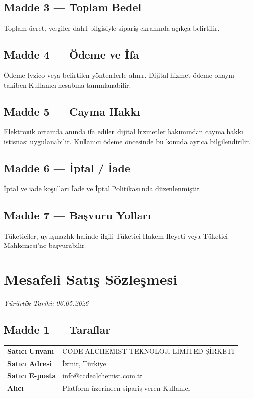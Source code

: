 \documentclass[12pt,a4paper]{article}
\begin{document}
\subsection*{Madde 3 --- Toplam Bedel}
Toplam \"{u}cret, vergiler dahil bilgisiyle sipari\c{s} ekran{\i}nda a\c{c}{\i}k\c{c}a belirtilir.

\subsection*{Madde 4 --- \"{O}deme ve \.{I}fa}
\"{O}deme Iyzico veya belirtilen y\"{o}ntemlerle al{\i}n{\i}r. Dijital hizmet \"{o}deme onayn{\i} takiben
Kullan{\i}c{\i} hesab{\i}na tan{\i}mlanabilir.

\subsection*{Madde 5 --- Cayma Hakk{\i}}
Elektronik ortamda an{\i}nda ifa edilen dijital hizmetler bak{\i}m{\i}ndan cayma hakk{\i} istisnas{\i}
uygulanabilir. Kullan{\i}c{\i} \"{o}deme \"{o}ncesinde bu konuda ayr{\i}ca bilgilendirilir.

\subsection*{Madde 6 --- \.{I}ptal / \.{I}ade}
\.{I}ptal ve iade ko\c{s}ullar{\i} \.{I}ade ve \.{I}ptal Politikas{\i}'nda d\"{u}zenlenmi\c{s}tir.

\subsection*{Madde 7 --- Ba\c{s}vuru Yollar{\i}}
T\"{u}keticiler, uyu\c{s}mazl{\i}k halinde ilgili T\"{u}ketici Hakem Heyeti veya T\"{u}ketici
Mahkemesi'ne ba\c{s}vurabilir.

\section{Mesafeli Sat{\i}\c{s} S\"{o}zle\c{s}mesi}
\textit{Y\"{u}r\"{u}rl\"{u}k Tarihi: 06.05.2026}

\subsection*{Madde 1 --- Taraflar}
\begin{center}
\begin{tabular}{|l|l|}
\hline
\textbf{Sat{\i}c{\i} Unvan{\i}} & CODE ALCHEMIST TEKNOLOJ\.{I} L\.{I}M\.{I}TED \c{S}\.{I}RKET\.{I} \\
\textbf{Sat{\i}c{\i} Adresi}   & \.{I}zmir, T\"{u}rkiye \\
\textbf{Sat{\i}c{\i} E-posta}  & info@codealchemist.com.tr \\
\textbf{Al{\i}c{\i}}           & Platform \"{u}zerinden sipari\c{s} veren Kullan{\i}c{\i} \\
\hline
\end{tabular}
\end{center}
\end{document}
